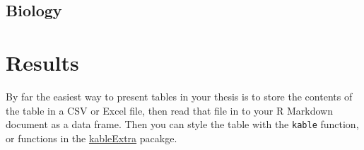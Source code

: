 \documentclass[twoside,12pt,final]{ucthesis-CA2012}
\begin{document}
\begin{ucmainmatter}
\hypertarget{biology}{%
\section{Biology}\label{biology}}

\hypertarget{ref-labels}{%
\chapter{Results}\label{ref-labels}}

By far the easiest way to present tables in your thesis is to store the contents of the table in a CSV or Excel file, then read that file in to your R Markdown document as a data frame. Then you can style the table with the \texttt{kable} function, or functions in the \href{https://cran.r-project.org/web/packages/kableExtra/index.html}{kableExtra} pacakge.


\end{ucmainmatter}
\end{document}
